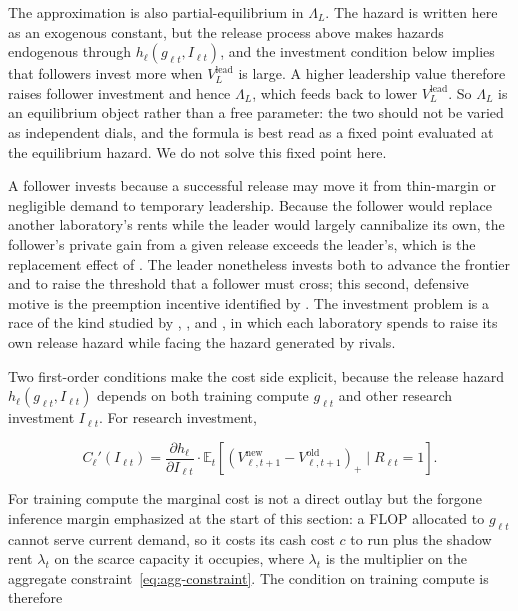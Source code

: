 \documentclass[11pt]{article}
\begin{document}
The approximation is also partial-equilibrium in $\Lambda_L$. The hazard is written here as an exogenous constant, but the release process above makes hazards endogenous through $h_\ell(g_{\ell t},I_{\ell t})$, and the investment condition below implies that followers invest more when $V_L^{\mathrm{lead}}$ is large. A higher leadership value therefore raises follower investment and hence $\Lambda_L$, which feeds back to lower $V_L^{\mathrm{lead}}$. So $\Lambda_L$ is an equilibrium object rather than a free parameter: the two should not be varied as independent dials, and the formula is best read as a fixed point evaluated at the equilibrium hazard. We do not solve this fixed point here.

A follower invests because a successful release may move it from thin-margin or negligible demand to temporary leadership. Because the follower would replace another laboratory's rents while the leader would largely cannibalize its own, the follower's private gain from a given release exceeds the leader's, which is the replacement effect of \citet{arrow1962}. The leader nonetheless invests both to advance the frontier and to raise the threshold that a follower must cross; this second, defensive motive is the preemption incentive identified by \citet{gilbertNewbery1982}. The investment problem is a race of the kind studied by \citet{loury1979}, \citet{leeWilde1980}, and \citet{reinganum1983}, in which each laboratory spends to raise its own release hazard while facing the hazard generated by rivals.

Two first-order conditions make the cost side explicit, because the release hazard $h_\ell(g_{\ell t},I_{\ell t})$ depends on both training compute $g_{\ell t}$ and other research investment $I_{\ell t}$. For research investment,

\begin{equation}C_\ell'(I_{\ell t})=\frac{\partial h_\ell}{\partial I_{\ell t}}\cdot\mathbb E_t\left[\left(V_{\ell,t+1}^{\mathrm{new}}-V_{\ell,t+1}^{\mathrm{old}}\right)_+\mid R_{\ell t}=1\right].\end{equation}

For training compute the marginal cost is not a direct outlay but the forgone inference margin emphasized at the start of this section: a FLOP allocated to $g_{\ell t}$ cannot serve current demand, so it costs its cash cost $c$ to run plus the shadow rent $\lambda_t$ on the scarce capacity it occupies, where $\lambda_t$ is the multiplier on the aggregate constraint~\eqref{eq:agg-constraint}. The condition on training compute is therefore
\end{document}
